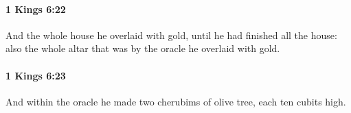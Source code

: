 		\paragraph{1 Kings 6:22} %
			\label{1KINGS-6-22}

			And the whole house he overlaid with gold, until he had finished all the house: also the whole altar that was by the oracle he overlaid with gold.


		\paragraph{1 Kings 6:23} %
			\label{1KINGS-6-23}

			And within the oracle he made two cherubims of olive tree, each ten cubits high.


